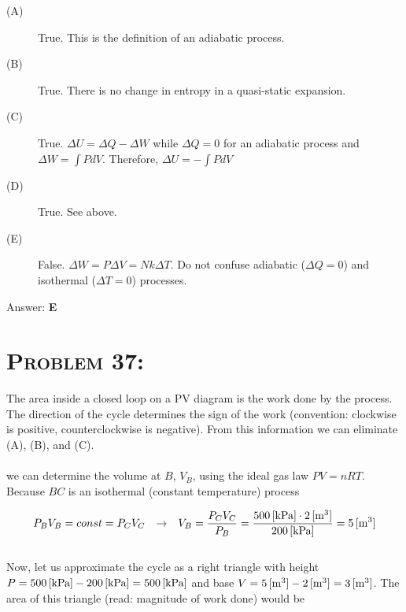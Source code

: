 \documentclass{article}
\begin{document}
\begin{description}

\item[(A)] True. This is the definition of an adiabatic process.

\item[(B)] True. There is no change in entropy in a quasi-static expansion.

\item[(C)] True.  $\Delta U = \Delta Q - \Delta W$ while $\Delta Q=0$ for an adiabatic process and $\Delta W = \int P dV$. Therefore, $\Delta U =  -\int P dV$

\item[(D)] True. See above.

\item[(E)] False. $\Delta W = P \Delta V = N k  \Delta T$. Do not confuse adiabatic ($\Delta Q = 0$) and isothermal  ($\Delta T = 0$) processes. \\

\end{description}
Answer: \textbf{\textcolor{ProcessBlue}E}\\


\section{\textsc{Problem 37:}} The area inside a closed loop on a PV diagram is the work done by the process. The direction of the cycle determines the sign of the work (convention: clockwise is positive, counterclockwise is negative). From this information we can eliminate (A), (B), and (C).\\
\\
we can determine the volume at $B$, $V_{B}$, using the ideal gas law $P V = n R T$. Because $BC$ is an isothermal (constant temperature) process

\begin{gather}
P_{B} V_{B} = const = P_{C} V_{C} \hspace{.1in} \rightarrow \hspace{.1in} V_{B} = \frac{P_{C} V_{C}}{P_{B}} = \frac{\unit[500]{[kPa]} \cdot \unit[2]{[m^{3}]}}{\unit[200]{[kPa]}} = \unit[5]{[m^{3}]}\nonumber
\end{gather}
\\
Now, let us approximate the cycle as a right triangle with height $P = \unit[500]{[kPa]}-\unit[200]{[kPa]} = \unit[500]{[kPa]}$ and base $V = \unit[5]{[m^{3}]} - \unit[2]{[m^{3}]} = \unit[3]{[m^{3}]}$. The area of this triangle (read: magnitude of work done) would be
\end{document}
